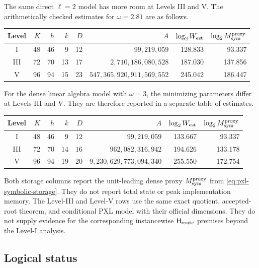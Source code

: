The same direct $\ell=2$ model has more room at Levels III and V.  The
arithmetically checked estimates for $\omega=2.81$ are as follows.
\begin{center}
\scriptsize
\setlength{\tabcolsep}{4pt}
\begin{tabular}{@{}c r r r r r r r@{}}
\toprule
Level & $K$ & $h$ & $k$ & $D$ & $A$
& $\log_2 W_{\rm est}$ & $\log_2 M_{\rm sym}^{\rm proxy}$\\
\midrule
I   & 48 & 46 & 9  & 12 & $99{,}219{,}059$
    & 128.833 & 93.337\\
III & 72 & 70 & 13 & 17 & $2{,}710{,}186{,}080{,}528$
    & 187.030 & 137.856\\
V   & 96 & 94 & 15 & 23 & $547{,}365{,}920{,}911{,}569{,}552$
    & 245.042 & 186.447\\
\bottomrule
\end{tabular}
\end{center}
For the dense linear algebra model with $\omega=3$, the minimizing parameters
differ at Levels III and V.  They are therefore reported in a separate table
of estimates.
\begin{center}
\scriptsize
\setlength{\tabcolsep}{4pt}
\begin{tabular}{@{}c r r r r r r r@{}}
\toprule
Level & $K$ & $h$ & $k$ & $D$ & $A$
& $\log_2 W_{\rm est}$ & $\log_2 M_{\rm sym}^{\rm proxy}$\\
\midrule
I   & 48 & 46 & 9  & 12 & $99{,}219{,}059$
    & 133.667 & 93.337\\
III & 72 & 70 & 14 & 16 & $962{,}082{,}316{,}942$
    & 194.626 & 133.178\\
V   & 96 & 94 & 19 & 20 & $9{,}230{,}629{,}773{,}094{,}340$
    & 255.550 & 172.754\\
\bottomrule
\end{tabular}
\end{center}
Both storage columns report the unit-leading dense proxy
$M_{\rm sym}^{\rm proxy}$ from \eqref{eq:pxl-symbolic-storage}.  They do not
report total state or peak implementation memory.
The Level-III and Level-V rows use the same exact quotient, accepted-root
theorem, and conditional PXL model with their official dimensions.  They do
not supply evidence for the corresponding instancewise
$\mathsf H_{\rm route}$ premises beyond the Level-I analysis.

\subsection{Logical status}

